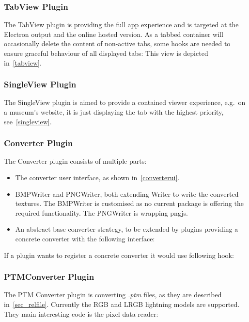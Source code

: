 \subsubsection{TabView Plugin}
The TabView plugin is providing the full app experience and is targeted at the
Electron output and the online hosted version. As a tabbed container will
occasionally delete the content of non-active tabs, some hooks are needed to
ensure graceful behaviour of all displayed tabs:
This view is depicted in~\autoref{tabview}.

\subsubsection{SingleView Plugin}
The SingleView plugin is aimed to provide a contained viewer experience, e.g.\ on
a museum's website, it is just displaying the tab with the highest priority, see~\autoref{singleview}.

\subsubsection{Converter Plugin}
The Converter plugin consists of multiple parts:
\begin{itemize}
\item The converter user interface, as shown in~\autoref{converterui}.
\item BMPWriter and PNGWriter, both extending Writer to write the converted
  textures. The BMPWriter is customised as no current package is offering the
  required functionality. The PNGWriter is wrapping pngjs.
\item An abstract base converter strategy, to be extended by plugins providing a
  concrete converter with the following interface:
\end{itemize}
If a plugin wants to register a concrete converter it would use following hook:

\subsubsection{PTMConverter Plugin}
The PTM Converter plugin is converting \emph{.ptm} files, as they are described
in~\autoref{sec_relfile}. Currently the RGB and LRGB lightning models are
supported. They main interesting code is the pixel data reader:


